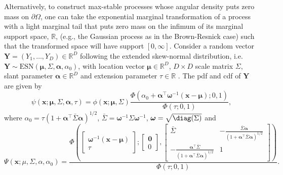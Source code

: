 \documentclass[12pt]{article}
\begin{document}
Alternatively, to construct max-stable processes whose angular density puts zero mass on $\partial\Omega$, one can take the exponential marginal transformation of a process with a light marginal tail that puts zero mass on the infimum of its marginal support space, $\mathbb R$, (e.g., the Gaussian process as in the Brown-Resnick case) such that the transformed space will have support $[0,\infty]$.  
%
Consider a random vector $\bm Y=(Y_1,\dots, Y_D) \in \mathbb{R}^D$ following the extended skew-normal distribution, i.e.~$\bm Y \sim \text{ESN}(\bm\mu,\Sigma,\bm\alpha,\alpha_0)$, with location vector $\bm\mu \in \mathbb{R}^D$, $D \times D$ scale matrix $\Sigma$, slant parameter $\bm \alpha \in \mathbb{R}^D$ and extension parameter $\tau \in \mathbb{R}$ \citep[see][Chapter 5]{Azzalini:2013}. The pdf and cdf of $\bm Y$ are given by 
%
%
$$
\psi(\bm x;\bm \mu,\Sigma,\bm \alpha,\tau) = 
\phi(\bm x;\bm \mu,\Sigma) 
\frac{\Phi\left(\alpha_0 + \bm\alpha^\top \bm \omega^{-1}\left(\bm x-\bm\mu\right); 0, 1\right)}{\Phi\left(\tau; 0, 1\right)},
$$
%
where $\alpha_0 = \tau \left(1+\bm\alpha^\top\bar\Sigma\bm\alpha \right)^{1/2}$, $\bar\Sigma = \bm \omega^{-1}\Sigma \bm \omega^{-1}$, $\bm \omega = \sqrt{\diag(\Sigma)}$ and
\begin{equation*}
    \Psi(\bm x;\mu,\Sigma,\alpha,\alpha_0) =
    \frac{\Phi \left(
    \begin{bmatrix} 
        \bm \omega^{-1}( \bm x- \bm \mu)  \\
        \tau
    \end{bmatrix};
    \begin{bmatrix} 
    \bm 0 \\ 0
    \end{bmatrix},
    \begin{bmatrix}
        \bar\Sigma & -\frac{\bar{\Sigma}\bm\alpha}{(1+\bm\alpha^\top\bar{\Sigma}\bm\alpha)^{1/2}} \\
       -\frac{\bm\alpha^\top\bar{\Sigma}}{\left(1+\bm\alpha^\top\bar{\Sigma}\bm\alpha\right)^{1/2}} &	1
    \end{bmatrix} \right)
    }
    {\Phi\left(\tau; 0, 1\right)}.
\end{equation*}
\end{document}
